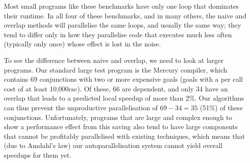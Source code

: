 
Most small programs like these benchmarks
have only one loop that dominates their runtime.
In all four of these benchmarks, and in many others,
the naive and overlap methods will parallelise the same loops,
and usually the same way;
they tend to differ only in how they parallelise code
that executes much less often (typically only once)
whose effect is lost in the noise.


To see the difference between naive and overlap,
we need to look at larger programs.
Our standard large test program is the Mercury compiler, which contains
69 conjunctions with two or more expensive goals
(goals with a per call cost of at least 10,000csc).
Of these, 66 are dependent,
and only 34 have an overlap
that leads to a predicted local speedup of more than 2\%.
Our algorithms can thus prevent
the unproductive parallelisation of $69-34=35$ (51\%) of these conjunctions.
Unfortunately, programs that are large and complex enough
to show a performance effect from this saving
also tend to have large components
that cannot be profitably parallelised with existing techniques,
which means that (due to Amdahl's law)
our autoparallelisation system cannot yield overall speedups for them yet.


